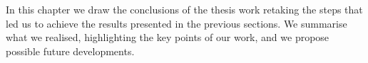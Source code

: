 In this chapter we draw the conclusions of the thesis work retaking the steps that led us to achieve the results presented in the previous sections.
We summarise what we realised, highlighting the key points of our work, and we propose possible future developments.





